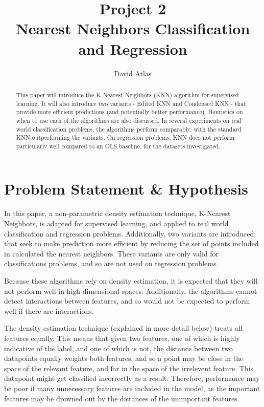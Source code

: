 \documentclass{amsart}
\title{Project 2 \\ Nearest Neighbors Classification and Regression}
\author{David Atlas}
\begin{document}
    \begin{abstract}
        This paper will introduce the K Nearest-Neighbors (KNN) algorithm for supervised learning.
        It will also introduce two variants - Edited KNN and Condensed KNN - that provide
        more efficient predictions (and potentially better performance).
        Heuristics on when to use each of the algorithms are also discussed.
        In several experiments on
        real world classification problems, the algorithms perform comparably, with the standard KNN
        outperforming the variants. On regression problems,
        KNN does not perform particularly well compared to an OLS baseline, for the datasets investigated.
    \end{abstract}
    \maketitle
    \section{Problem Statement \& Hypothesis}
    In this paper, a non-parametric density estimation technique, K-Nearest Neighbors,
    is adapted for supervised learning, and applied to
    real world classification and regression problems. Additionally,
    two variants are introduced that seek to make prediction more efficient
    by reducing the set of points included in calculated the nearest neighbors. These variants
    are only valid for classifications problems, and so are not used on regression problems.

    Because these algorithms rely on density estimation, it is expected that they will
    not perform well in high dimensional spaces. Additionally, the algorithms cannot detect
    interactions between features, and so would not be expected to perform well if there are
    interactions.

    The density estimation technique (explained in more detail below) treats
    all features equally. This means that given two features, one of which is highly
    indicative of the label, and one of which is not, the distance between two datapoints
    equally weights both features, and so a point may be close in the space of the relevant
    feature, and far in the space of the irrelevent feature. This datapoint might get classified incorrectly
    as a result. Therefore, performance may be poor if many unnecessary features are
    included in the model, as the important features may be drowned out by the distances
    of the unimportant features.
\end{document}
